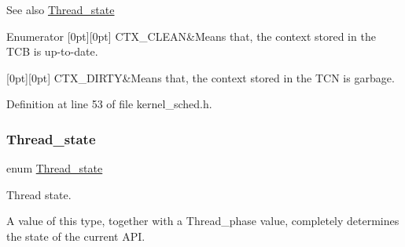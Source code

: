 \begin{DoxySeeAlso}{See also}
\hyperlink{group__scheduler_ga6c969c169777f82c104cf73e501df70f}{Thread\+\_\+state} 
\end{DoxySeeAlso}
\begin{DoxyEnumFields}{Enumerator}
[0pt][0pt]{}\mbox{\label{group__scheduler_ggab180b4aa356776bddcd724cef4f5deaeaa826daca588e692c88114586b0de472b}} 
C\+T\+X\+\_\+\+C\+L\+E\+AN&Means that, the context stored in the T\+CB is up-\/to-\/date. \\
\hline

[0pt][0pt]{}\mbox{\label{group__scheduler_ggab180b4aa356776bddcd724cef4f5deaea2b4b41fda67c1a83e6523675515c007b}} 
C\+T\+X\+\_\+\+D\+I\+R\+TY&Means that, the context stored in the T\+CN is garbage. \\
\hline

\end{DoxyEnumFields}


Definition at line 53 of file kernel\+\_\+sched.\+h.

\mbox{\label{group__scheduler_ga6c969c169777f82c104cf73e501df70f}} 
\subsubsection{\texorpdfstring{Thread\+\_\+state}{Thread\_state}}
{\footnotesize\ttfamily enum \hyperlink{group__scheduler_ga6c969c169777f82c104cf73e501df70f}{Thread\+\_\+state}}



Thread state. 

A value of this type, together with a {\ttfamily Thread\+\_\+phase} value, completely determines the state of the current A\+PI.

